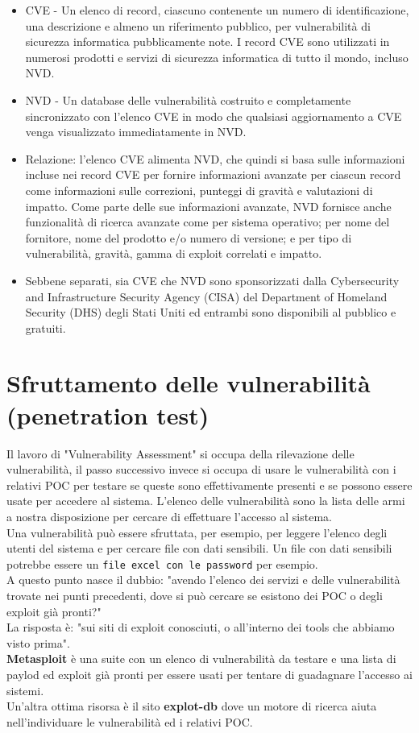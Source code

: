 \documentclass[a4paper,12pt]{article}
\begin{document}
\begin{itemize}
\item CVE - Un elenco di record, ciascuno contenente un numero di identificazione, una descrizione e almeno un riferimento pubblico, per vulnerabilità di sicurezza informatica pubblicamente note. I record CVE sono utilizzati in numerosi prodotti e servizi di sicurezza informatica di tutto il mondo, incluso NVD.
\item NVD - Un database delle vulnerabilità costruito e completamente sincronizzato con l'elenco CVE in modo che qualsiasi aggiornamento a CVE venga visualizzato immediatamente in NVD.
\item Relazione: l'elenco CVE alimenta NVD, che quindi si basa sulle informazioni incluse nei record CVE per fornire informazioni avanzate per ciascun record come informazioni sulle correzioni, punteggi di gravità e valutazioni di impatto. Come parte delle sue informazioni avanzate, NVD fornisce anche funzionalità di ricerca avanzate come per sistema operativo; per nome del fornitore, nome del prodotto e/o numero di versione; e per tipo di vulnerabilità, gravità, gamma di exploit correlati e impatto.

\item Sebbene separati, sia CVE che NVD sono sponsorizzati dalla Cybersecurity and Infrastructure Security Agency (CISA) del Department of Homeland Security (DHS) degli Stati Uniti ed entrambi sono disponibili al pubblico e gratuiti.
\end{itemize}


\section{  Sfruttamento delle vulnerabilità (penetration test) }

Il lavoro di "Vulnerability Assessment" si occupa della rilevazione delle vulnerabilità, il passo successivo invece si occupa di usare le vulnerabilità con i relativi POC per testare se queste sono effettivamente presenti e se possono essere usate per accedere al sistema. L'elenco delle vulnerabilità sono la lista delle armi a nostra disposizione per cercare di effettuare l'accesso al sistema.\\ 
Una vulnerabilità può essere sfruttata, per esempio, per leggere l'elenco degli utenti del sistema e per cercare file con dati sensibili. Un file con dati sensibili potrebbe essere un \texttt{file excel con le password} per esempio. \\ 
A questo punto nasce il dubbio: "avendo l'elenco dei servizi e delle vulnerabilità trovate nei punti precedenti, dove si può cercare se esistono dei POC o degli exploit già pronti?" \\
La risposta è: "sui siti di exploit conosciuti, o all'interno dei tools che abbiamo visto prima". \\\textbf{ Metasploit}\cite{metasploit} è una suite con un elenco di vulnerabilità da testare e una lista di  paylod ed exploit già pronti per essere usati per tentare di guadagnare l'accesso ai sistemi. \\
Un'altra ottima risorsa è il sito\textbf{ explot-db}\cite{explot-db} dove un motore di ricerca aiuta nell'individuare le vulnerabilità ed i relativi POC.
\end{document}
